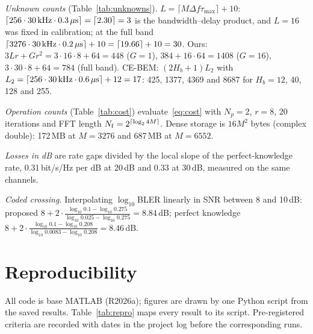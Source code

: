 \emph{Unknown counts} (Table~\ref{tab:unknowns}). $L=\lceil M\Delta f\tau_{\max}\rceil+10$:
$\lceil256\cdot30\,{\rm kHz}\cdot0.3\,\mu{\rm s}\rceil=\lceil2.30\rceil=3$ is the bandwidth--delay
product, and $L=16$ was fixed in calibration; at the full band $\lceil3276\cdot30\,{\rm kHz}\cdot0.2\,\mu{\rm s}\rceil+10=\lceil19.66\rceil+10=30$.
Ours: $3Lr+Gr^2=3\cdot16\cdot8+64=448$ ($G=1$), $384+16\cdot64=1408$ ($G=16$), $3\cdot30\cdot8+64=784$
(full band). CE-BEM: $(2H_b+1)L_2$ with $L_2=\lceil256\cdot30\,{\rm kHz}\cdot0.6\,\mu{\rm s}\rceil+12=17$:
425, 1377, 4369 and 8687 for $H_b=12$, 40, 128 and 255.

\emph{Operation counts} (Table~\ref{tab:cost}) evaluate~\eqref{eq:cost} with $N_p=2$, $r=8$, 20
iterations and FFT length $N_{\rm f}=2^{\lceil\log_2 4M\rceil}$. Dense storage is $16M^2$ bytes
(complex double): 172\,MB at $M=3276$ and 687\,MB at $M=6552$.

\emph{Losses in dB} are rate gaps divided by the local slope of the perfect-knowledge rate,
0.31\,bit/s/Hz per dB at 20\,dB and 0.33 at 30\,dB, measured on the same channels.

\emph{Coded crossing.} Interpolating $\log_{10}$BLER linearly in SNR between 8 and 10\,dB:
proposed $8+2\cdot\frac{\log_{10}0.1-\log_{10}0.275}{\log_{10}0.025-\log_{10}0.275}=8.84$\,dB; perfect
knowledge $8+2\cdot\frac{\log_{10}0.1-\log_{10}0.208}{\log_{10}0.0083-\log_{10}0.208}=8.46$\,dB.

\section{Reproducibility}\label{app:repro}
All code is base MATLAB (R2026a); figures are drawn by one Python script from the saved results.
Table~\ref{tab:repro} maps every result to its script. Pre-registered criteria are recorded with
dates in the project log before the corresponding runs.

